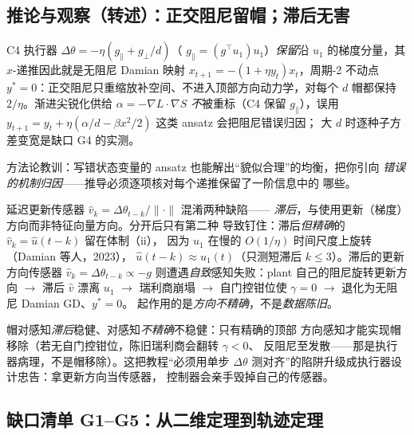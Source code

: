 \subsection{推论与观察（转述）：正交阻尼留帽；滞后无害}\label{sec:ch09-orth-lag}

\begin{corollary}
C4 执行器 $\Delta\theta=-\eta(g_{\parallel}+g_{\perp}/d)$（
$g_{\parallel}=(g^{\!\top}u_1)u_1$）\emph{保留}沿 $u_1$ 的梯度分量，其
$x$-递推因此就是无阻尼 Damian 映射 $x_{t+1}=-(1+\eta y_t)x_t$，周期-2
不动点 $y^{*}=0$：正交阻尼只重缩放补空间、不进入顶部方向动力学，对每个
$d$ 帽都保持 $2/\eta$。渐进尖锐化供给 $\alpha=-\nabla L\cdot\nabla S$
\emph{不}被重标（C4 保留 $g_{\parallel}$），误用
$y_{t+1}=y_t+\eta(\alpha/d-\beta x^2/2)$ 这类 ansatz 会把阻尼错误归因；
大 $d$ 时逐种子方差变宽是缺口 G4 的实测。
\end{corollary}

方法论教训：写错状态变量的 ansatz 也能解出“貌似合理”的均衡，把你引向
\emph{错误的机制归因}——推导必须逐项核对每个递推保留了一阶信息中的
哪些。

\begin{observation}
延迟更新传感器 $\hat v_k=\Delta\theta_{t-k}/\|\cdot\|$ 混淆两种缺陷——
\emph{滞后}，与使用更新（梯度）方向而非特征向量方向。分开后只有第二种
导致钉住：滞后\emph{但精确}的 $\hat v_k=\hat u(t-k)$ 留在体制（ii），
因为 $u_1$ 在慢的 $O(1/\eta)$ 时间尺度上旋转（Damian 等人，2023），
$\hat u(t-k)\approx u_1(t)$（只测短滞后 $k\le3$）。滞后的更新方向传感器
$\hat v_k=\Delta\theta_{t-k}\propto-g$ 则遭遇\emph{自致}感知失败：plant
自己的阻尼旋转更新方向 $\to$ 滞后 $\hat v$ 漂离 $u_1$ $\to$ 瑞利商崩塌
$\to$ 自门控钳位使 $\gamma=0$ $\to$ 退化为无阻尼 Damian GD、$y^{*}=0$。
起作用的是\emph{方向不精确}，不是\emph{数据陈旧}。
\end{observation}

帽对感知\emph{滞后}稳健、对感知\emph{不精确}不稳健：只有精确的顶部
方向感知才能实现帽移除（若无自门控钳位，陈旧瑞利商会翻转 $\gamma<0$、
反阻尼至发散——那是执行器病理，不是帽移除）。这把教程“必须用单步
$\Delta\theta$ 测对齐”的陷阱升级成执行器设计忠告：拿更新方向当传感器，
控制器会亲手毁掉自己的传感器。

\subsection{缺口清单 G1--G5：从二维定理到轨迹定理}\label{sec:ch09-gaps}

